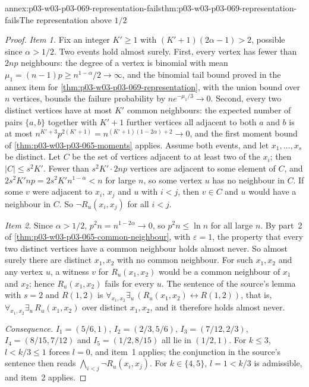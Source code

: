 \begin{annexitem}{annex:p03-w03-p03-069-representation-fails}{thm:p03-w03-p03-069-representation-fails}{The representation above \(1/2\)}
\begin{proof}
\emph{Item 1.}  Fix an integer \(K'\geq1\) with \((K'+1)(2\alpha-1)>2\),
possible since \(\alpha>1/2\).  Two events hold almost surely.  First, every
vertex has fewer than \(2np\) neighbours: the degree of a vertex is binomial
with mean \(\mu_1=(n-1)p\geq n^{1-\alpha}/2\to\infty\), and the binomial tail
bound proved in the annex item for
\cref{thm:p03-w03-p03-069-representation}, with the union bound over \(n\)
vertices, bounds the failure probability by \(ne^{-\mu_1/3}\to0\).  Second,
every two distinct vertices have at most \(K'\) common neighbours: the
expected number of pairs \(\{a,b\}\) together with \(K'+1\) further vertices
all adjacent to both \(a\) and \(b\) is at most
\(n^{K'+3}p^{2(K'+1)}=n^{(K'+1)(1-2\alpha)+2}\to0\), and the first moment
bound of \cref{thm:p03-w03-p03-065-moments} applies.  Assume both events,
and let \(x_1,\ldots,x_s\) be distinct.  Let \(C\) be the set of vertices
adjacent to at least two of the \(x_i\); then \(|C|\leq s^2K'\).  Fewer than
\(s^2K'\cdot2np\) vertices are adjacent to some element of \(C\), and
\(2s^2K'np=2s^2K'n^{1-\alpha}<n\) for large \(n\), so some vertex \(u\) has
no neighbour in \(C\).  If some \(v\) were adjacent to \(x_i\), \(x_j\) and
\(u\) with \(i<j\), then \(v\in C\) and \(u\) would have a neighbour in
\(C\).  So \(\neg R_u(x_i,x_j)\) for all \(i<j\).

\emph{Item 2.}  Since \(\alpha>1/2\), \(p^2n=n^{1-2\alpha}\to0\), so
\(p^2n\leq\ln n\) for all large \(n\).  By part~2 of
\cref{thm:p03-w03-p03-065-common-neighbour}, with \(\varepsilon=1\), the
property that every two distinct vertices have a common neighbour holds almost
never.  So almost surely there are distinct \(x_1,x_2\) with no common
neighbour.  For such \(x_1,x_2\) and any vertex \(u\), a witness \(v\) for
\(R_u(x_1,x_2)\) would be a common neighbour of \(x_1\) and \(x_2\); hence
\(R_u(x_1,x_2)\) fails for every \(u\).  The sentence of the source's lemma
with \(s=2\) and \(R(1,2)\) is
\(\forall_{x_1,x_2}\exists_u\,(R_u(x_1,x_2)\leftrightarrow R(1,2))\), that
is, \(\forall_{x_1,x_2}\exists_u\,R_u(x_1,x_2)\) over distinct
\(x_1,x_2\), and it therefore holds almost never.

\emph{Consequence.}  \(I_1=(5/6,1)\), \(I_2=(2/3,5/6)\), \(I_3=(7/12,2/3)\),
\(I_4=(8/15,7/12)\) and \(I_5=(1/2,8/15)\) all lie in \((1/2,1)\).  For
\(k\leq3\), \(l<k/3\leq1\) forces \(l=0\), and item~1 applies; the
conjunction in the source's sentence then reads
\(\bigwedge_{i<j}\neg R_u(x_i,x_j)\).  For \(k\in\{4,5\}\), \(l=1<k/3\) is
admissible, and item~2 applies.
\end{proof}
\end{annexitem}

